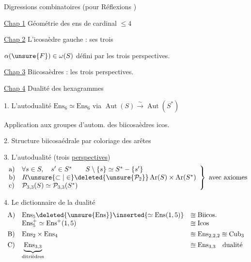 
Digressions combinatoires (pour Réflexions )

\uline{Chap 1} Géométrie des ens de cardinal $\leq4$


\uline{Chap 2} L'icosaèdre gauche : ses trois

$\alpha(\unsure{F})\in\omega(S)$ défini par les trois perspectives.

\uline{Chap 3} Biicosaèdres : les trois perspectives.

\uline{Chap 4} Dualité des hexagrammes


1. L'autodualité $\mathrm{Ens}_6\simeq\mathrm{Ens}_6$
 via
$\operatorname{Aut}(S)\xrightarrow{\sim}\operatorname{Aut}(S^*)$

Application aux groupes d'autom. des
biicosaèdres  icos.

2. Structure biicosaédrale par coloriage des arêtes

3. L'autodualité (trois \uline{perspectives})
\[
\left.\begin{array}{ll}
\text{a)}&\forall s\in S,\quad s'\in S^*\qquad
 S\setminus\{s\}\simeq S^*-\{s'\}\\
\text{b)}&R\unsure{\subset|\in}\deleted{\unsure{\mathcal P_2}}
 \operatorname{Ar}(S)\times\operatorname{Ar}(S^*)\\
\text{c)}&\mathcal P_{3,3}(S)\simeq\mathcal P_{3,3}(S^*)
\end{array}\right\}\ \text{avec axiomes}
\]

4. Le dictionnaire de la dualité
\[
\begin{array}{lll}
\text{A)}&\mathrm{Ens}_5\deleted{\unsure{\mathrm{Ens}}}
 \inserted{\simeq\mathrm{Ens}(1,5)}&\approxeq\mathrm{Biicos.}\\
&\mathrm{Ens}_5^+\simeq\mathrm{Ens}^+(1,5)&\approxeq\mathrm{Icos}\\[1ex]
\text{B)}&\mathrm{Ens}_2\times\mathrm{Ens}_4
 &\approxeq\mathrm{Ens}_{2,2,2}\approxeq\mathrm{Cub}_3\\[1ex]
\text{C)}&\underbrace{\mathrm{Ens}_{3,3}}_{\text{ditrièdres}}
 &\approxeq\mathrm{Ens}_{3,3}\quad\text{dualité}
\end{array}
\]

